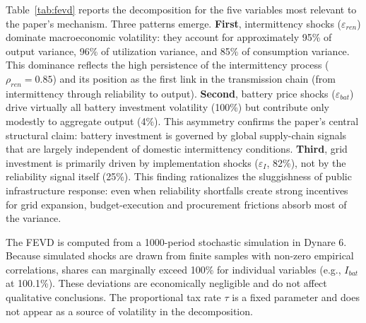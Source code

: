 Table~\ref{tab:fevd} reports the decomposition for the five variables most relevant to the paper's mechanism. Three patterns emerge. \textbf{First}, intermittency shocks ($\varepsilon_{ren}$) dominate macroeconomic volatility: they account for approximately 95\% of output variance, 96\% of utilization variance, and 85\% of consumption variance. This dominance reflects the high persistence of the intermittency process ($\rho_{ren}=0.85$) and its position as the first link in the transmission chain (from intermittency through reliability to output). \textbf{Second}, battery price shocks ($\varepsilon_{bat}$) drive virtually all battery investment volatility (100\%) but contribute only modestly to aggregate output (4\%). This asymmetry confirms the paper's central structural claim: battery investment is governed by global supply-chain signals that are largely independent of domestic intermittency conditions. \textbf{Third}, grid investment is primarily driven by implementation shocks ($\varepsilon_I$, 82\%), not by the reliability signal itself (25\%). This finding rationalizes the sluggishness of public infrastructure response: even when reliability shortfalls create strong incentives for grid expansion, budget-execution and procurement frictions absorb most of the variance.

The FEVD is computed from a 1000-period stochastic simulation in Dynare 6. Because simulated shocks are drawn from finite samples with non-zero empirical correlations, shares can marginally exceed 100\% for individual variables (e.g., $I_{bat}$ at 100.1\%). These deviations are economically negligible and do not affect qualitative conclusions. The proportional tax rate $\tau$ is a fixed parameter and does not appear as a source of volatility in the decomposition.

